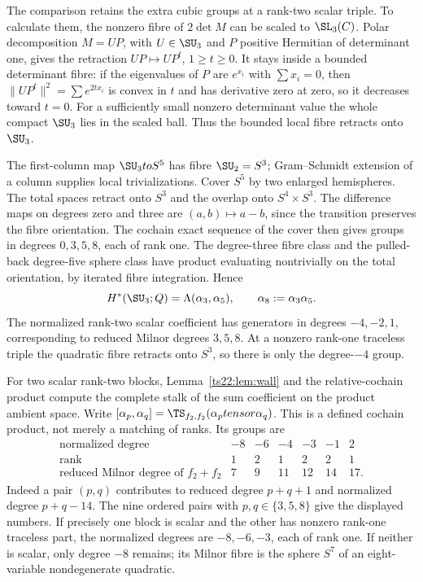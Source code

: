 The comparison retains the extra cubic groups at a rank-two scalar
triple. To calculate them, the nonzero fibre of $2\det M$ can be scaled to $\SL_3(\C)$. Polar decomposition
$M=UP$, with $U\in\SU_3$ and $P$ positive Hermitian of determinant
one, gives the retraction $UP\mapsto UP^t$, $1\ge t\ge0$.
It stays inside a bounded determinant fibre: if the eigenvalues of
$P$ are $e^{x_i}$ with $\sum x_i=0$, then
$\|UP^t\|^2=\sum e^{2tx_i}$ is convex in $t$ and has derivative
zero at zero, so it decreases toward $t=0$. For a sufficiently small
nonzero determinant value the whole compact $\SU_3$ lies in the
scaled ball. Thus the bounded local fibre retracts onto $\SU_3$.

The first-column map $\SU_3\to S^5$ has fibre $\SU_2=S^3$;
Gram--Schmidt extension of a column supplies local trivializations.
Cover $S^5$ by two enlarged hemispheres. The total spaces retract
onto $S^3$ and the overlap onto $S^4\times S^3$. The difference maps
on degrees zero and three are $(a,b)\mapsto a-b$, since the transition
preserves the fibre orientation. The cochain exact sequence of the
cover then gives groups in degrees $0,3,5,8$, each of rank one.
The degree-three fibre class and the pulled-back degree-five sphere
class have product evaluating nontrivially on the total orientation,
by iterated fibre integration. Hence
\[
 H^*(\SU_3;\Q)=\Lambda(\alpha_3,\alpha_5),
 \qquad \alpha_8:=\alpha_3\alpha_5.
\]
The normalized rank-two scalar coefficient has generators in degrees
$-4,-2,1$, corresponding to reduced Milnor degrees $3,5,8$.
At a nonzero rank-one traceless triple the quadratic fibre retracts
onto $S^3$, so there is only the degree-$-4$ group.

For two scalar rank-two blocks, Lemma~\ref{ts22:lem:wall} and the
relative-cochain product compute the complete stalk of the sum
coefficient on the product ambient space. Write
$[\alpha_p,\alpha_q]=\TS_{f_2,f_2}(\alpha_p\otimes\alpha_q)$.
This is a defined cochain product, not merely a matching of ranks.
Its groups are
\[
\begin{array}{c|rrrrrr}
 \text{normalized degree}&-8&-6&-4&-3&-1&2\\ \hline
 \text{rank}&1&2&1&2&2&1\\
 \text{reduced Milnor degree of }f_2+f_2&7&9&11&12&14&17.
\end{array}
\]
Indeed a pair $(p,q)$ contributes to reduced degree $p+q+1$ and
normalized degree $p+q-14$. The nine ordered pairs with
$p,q\in\{3,5,8\}$ give the displayed numbers.
If precisely one block is scalar and the other has nonzero rank-one
traceless part, the normalized degrees are $-8,-6,-3$, each of rank
one. If neither is scalar, only degree $-8$ remains; its Milnor
fibre is the sphere $S^7$ of an eight-variable nondegenerate quadratic.

